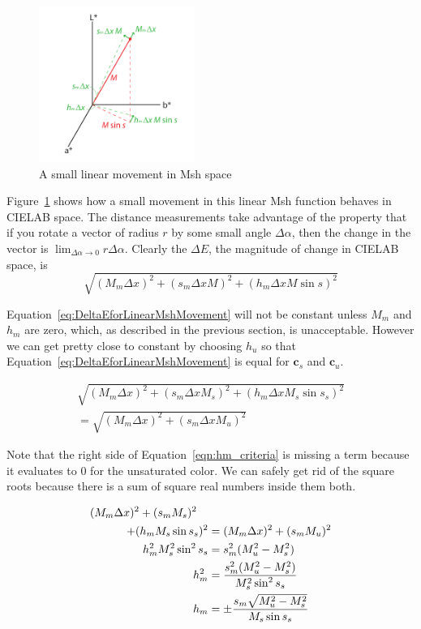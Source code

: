 \documentclass{acmsiggraph}               %
\newcommand{\Lab}{CIELAB\xspace}
\newcommand{\Msh}{Msh\xspace}
\newcommand{\DeltaE}{\ensuremath{\Delta{}E}\xspace}
\newcommand*{\cvec}[1]{\mathbf{#1}}
\begin{document}
\begin{figure}
  \centering
  \includegraphics[height=2in]{images/MshDeltaMovements}
  \caption{A small linear movement in \Msh space}
  \label{sec:LinearMshMovement}
\end{figure}

Figure~\ref{sec:LinearMshMovement} shows how a small movement in this
linear \Msh function behaves in \Lab space.  The distance measurements take
advantage of the property that if you rotate a vector of radius $r$ by some
small angle $\Delta\alpha$, then the change in the vector is
$\lim_{\Delta\alpha \rightarrow 0}r \Delta\alpha$.  Clearly the \DeltaE,
the magnitude of change in \Lab space, is
\begin{equation}
  \sqrt{(M_m \Delta x)^2 + (s_m \Delta x M)^2 + (h_m \Delta x M \sin s)^2}
  \label{eq:DeltaEforLinearMshMovement}
\end{equation}

Equation~\ref{eq:DeltaEforLinearMshMovement} will not be constant unless
$M_m$ and $h_m$ are zero, which, as described in the previous section, is
unacceptable.  However we can get pretty close to constant by choosing
$h_u$ so that Equation~\ref{eq:DeltaEforLinearMshMovement} is equal for
$\cvec{c}_s$ and $\cvec{c}_u$.

\begin{multline}
  \sqrt{(M_m \Delta x)^2 + (s_m \Delta x M_s)^2 + (h_m \Delta x M_s \sin s_s)^2}
  \\ =
  \sqrt{(M_m \Delta x)^2 + (s_m \Delta x M_u)^2}
  \label{eqn:hm_criteria}
\end{multline}

Note that the right side of Equation~\ref{eqn:hm_criteria} is missing a
term because it evaluates to 0 for the unsaturated color.  We can safely
get rid of the square roots because there is a sum of square real numbers
inside them both.

\begin{align}
    (M_m \Delta x)^2 + (s_m M_s)^2 \quad & \notag \\
    + (h_m M_s \sin s_s)^2 &= (M_m \Delta x)^2 + (s_m M_u)^2 \notag \\
    h_m^2 M_s^2 \sin^2 s_s &= s_m^2 (M_u^2 - M_s^2) \notag \\
    h_m^2 &= \frac{s_m^2 (M_u^2 - M_s^2)}{M_s^2 \sin^2 s_s} \notag \\
    h_m &= \pm \frac{s_m \sqrt{M_u^2 - M_s^2}}{M_s \sin s_s}
    \label{eqn:adjusted_hm}
\end{align}
\end{document}
